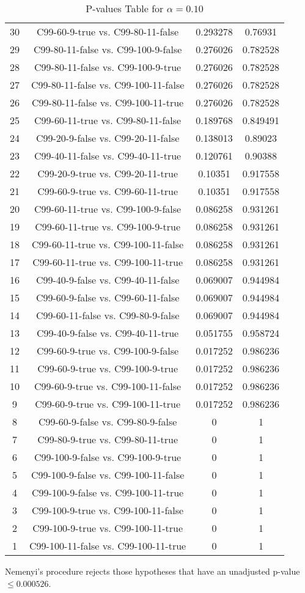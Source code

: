 \documentclass[a4paper,10pt]{article}
\begin{document}
\begin{landscape}
\begin{table}[!htp]
\begin{tabular}{cccc}
30&C99-60-9-true vs. C99-80-11-false&0.293278&0.76931\\
29&C99-80-11-false vs. C99-100-9-false&0.276026&0.782528\\
28&C99-80-11-false vs. C99-100-9-true&0.276026&0.782528\\
27&C99-80-11-false vs. C99-100-11-false&0.276026&0.782528\\
26&C99-80-11-false vs. C99-100-11-true&0.276026&0.782528\\
25&C99-60-11-true vs. C99-80-11-false&0.189768&0.849491\\
24&C99-20-9-false vs. C99-20-11-false&0.138013&0.89023\\
23&C99-40-11-false vs. C99-40-11-true&0.120761&0.90388\\
22&C99-20-9-true vs. C99-20-11-true&0.10351&0.917558\\
21&C99-60-9-true vs. C99-60-11-true&0.10351&0.917558\\
20&C99-60-11-true vs. C99-100-9-false&0.086258&0.931261\\
19&C99-60-11-true vs. C99-100-9-true&0.086258&0.931261\\
18&C99-60-11-true vs. C99-100-11-false&0.086258&0.931261\\
17&C99-60-11-true vs. C99-100-11-true&0.086258&0.931261\\
16&C99-40-9-false vs. C99-40-11-false&0.069007&0.944984\\
15&C99-60-9-false vs. C99-60-11-false&0.069007&0.944984\\
14&C99-60-11-false vs. C99-80-9-false&0.069007&0.944984\\
13&C99-40-9-false vs. C99-40-11-true&0.051755&0.958724\\
12&C99-60-9-true vs. C99-100-9-false&0.017252&0.986236\\
11&C99-60-9-true vs. C99-100-9-true&0.017252&0.986236\\
10&C99-60-9-true vs. C99-100-11-false&0.017252&0.986236\\
9&C99-60-9-true vs. C99-100-11-true&0.017252&0.986236\\
8&C99-60-9-false vs. C99-80-9-false&0&1\\
7&C99-80-9-true vs. C99-80-11-true&0&1\\
6&C99-100-9-false vs. C99-100-9-true&0&1\\
5&C99-100-9-false vs. C99-100-11-false&0&1\\
4&C99-100-9-false vs. C99-100-11-true&0&1\\
3&C99-100-9-true vs. C99-100-11-false&0&1\\
2&C99-100-9-true vs. C99-100-11-true&0&1\\
1&C99-100-11-false vs. C99-100-11-true&0&1\\
\hline
\end{tabular}
\caption{P-values Table for $\alpha=0.10$}
\end{table}Nemenyi's procedure rejects those hypotheses that have an unadjusted p-value $\le0.000526$.


\end{landscape}
\end{document}
